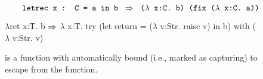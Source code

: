 \begin{figure*}[h!]

\newline
\begin{minipage}[b]{0.3\textwidth}
  \begin{prooftree}
  \end{prooftree}
\end{minipage}
\begin{minipage}[b]{0.5\textwidth}
  \begin{prooftree}
  \end{prooftree}
\end{minipage}
\begin{minipage}[b]{0.4\textwidth}
  \begin{prooftree}
  \end{prooftree}
\end{minipage}

\begin{minipage}[b]{0.45\textwidth}
  \begin{prooftree}
  \end{prooftree}
\end{minipage}
\begin{minipage}[b]{0.45\textwidth}
  \begin{prooftree}
  \end{prooftree}
\end{minipage}

\[
\qquad\DesugarRule
    {letrec x : C = a in b}
    {($\lambda$ x:C. b) (fix ($\lambda$ x:C. a))}
\]
\begin{Codes}
\(\lambda\)ret x:T. b
\(\To\) \(\lambda\) x:T. try (let return = (\(\lambda\) v:Str. raise v) in b) with (\(\lambda\) v:Str. v)
\end{Codes}
\qquad {} is a function with 
automatically bound (i.e., marked as capturing) to escape from the function.


\end{figure*}
